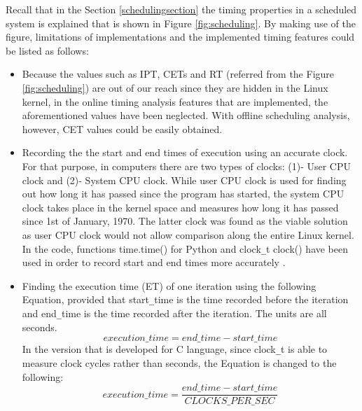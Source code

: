 Recall that in the Section \ref{schedulingsection} the timing properties in a scheduled system is explained that is shown in Figure \ref{fig:scheduling}. By making use of the figure, limitations of implementations and the implemented timing features could be listed as follows:
\begin{itemize}
	\item Because the values such as IPT, CETs and RT (referred from the Figure \ref{fig:scheduling}) are out of our reach since they are hidden in the Linux kernel, in the online timing analysis features that are implemented, the aforementioned values have been neglected. With offline scheduling analysis, however, CET values could be easily obtained.
	\item Recording the the start and end times of execution using an accurate clock. For that purpose, in computers there are two types of clocks: (1)- User CPU clock and (2)- System CPU clock. While user CPU clock is used for finding out how long it has passed since the program has started, the system CPU clock takes place in the kernel space and measures how long it has passed since 1st of January, 1970. The latter clock was found as the viable solution as user CPU clock would not allow comparison along the entire Linux kernel. In the code, functions time.time() for Python and clock\texttt{\_}t clock() have been used in order to record start and end times more accurately \cite{cpuandusertimes} \cite{cpuandusertimes2}.
	\item Finding the execution time (ET) of one iteration using the following Equation, provided that start\texttt{\_}time is the time recorded before the iteration and end\texttt{\_}time is the time recorded after the iteration. The units are all seconds.
	\begin{equation}
	execution\texttt{\_}time=end\texttt{\_}time - start\texttt{\_}time
	\end{equation}
	In the version that is developed for C language, since clock\texttt{\_}t is able to measure clock cycles rather than seconds, the Equation is changed to the following:
	\begin{equation}
	execution\texttt{\_}time=\frac{end\texttt{\_}time - start\texttt{\_}time} {CLOCKS\texttt{\_}PER\texttt{\_}SEC}
	\end{equation}
	

\end{itemize}
